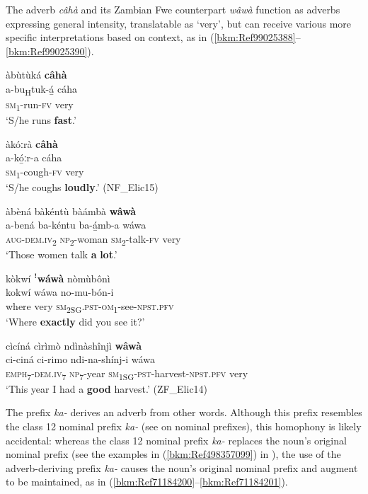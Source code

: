 The adverb \textit{câhà} and its Zambian Fwe counterpart \textit{wâwà} function as adverbs expressing general intensity, translatable as ‘very’, but can receive various more specific interpretations based on context, as in (\ref{bkm:Ref99025388}--\ref{bkm:Ref99025390}).

\ea
\label{bkm:Ref99025388}
àbùtùká \textbf{câhà}\\
\gll a-bu\textsubscript{H}tuk-á̲  cáha\\
\textsc{sm}\textsubscript{1}-run-\textsc{fv}  very\\
\glt ‘S/he runs \textbf{fast}.’
\z

\ea
\glll àkóːrà \textbf{câhà}\\
a-kó̲ːr-a    cáha\\
\textsc{sm}\textsubscript{1}-cough-\textsc{fv}  very\\
\glt ‘S/he coughs \textbf{loudly}.’ (NF\_Elic15)
\z

\ea
àbèná bàkéntù bàámbà \textbf{wâwà}\\
\gll a-bená  ba-kéntu  ba-á̲mb-a  wáwa\\
\textsc{aug}-\textsc{dem}.\textsc{iv}\textsubscript{2}  \textsc{np}\textsubscript{2}-woman  \textsc{sm}\textsubscript{2}-talk-\textsc{fv}  very\\
\glt ‘Those women talk \textbf{a} \textbf{lot}.’
\z

\ea
kòkwí  ꜝ\textbf{wáwà} nòmùbônì\\
\gll kokwí  wáwa  no-mu-bón-i\\
where  very  \textsc{sm}\textsubscript{2SG}.\textsc{pst}-\textsc{om}\textsubscript{1}-see-\textsc{npst}.\textsc{pfv}\\
\glt ‘Where \textbf{exactly} did you see it?’
\z

\ea
\label{bkm:Ref99025390}
cìcíná cìrìmò ndìnàshînjì \textbf{wâwà}\\
\gll ci-ciná    ci-rimo  ndi-na-shínj-i      wáwa\\
\textsc{emph}\textsubscript{7}-\textsc{dem}.\textsc{iv}\textsubscript{7}  \textsc{np}\textsubscript{7}-year  \textsc{sm}\textsubscript{1SG}-\textsc{pst}-harvest-\textsc{npst}.\textsc{pfv}  very\\
\glt ‘This year I had a \textbf{good} harvest.’ (ZF\_Elic14)
\z

The prefix \textit{ka-} derives an adverb from other words. Although this prefix resembles the class 12 nominal prefix \textit{ka-} (see  on nominal prefixes), this homophony is likely accidental: whereas the class 12 nominal prefix \textit{ka-} replaces the noun’s original nominal prefix (see the examples in (\ref{bkm:Ref498357099}) in ), the use of the adverb-deriving prefix \textit{ka-} causes the noun’s original nominal prefix and augment to be maintained, as in (\ref{bkm:Ref71184200}--\ref{bkm:Ref71184201}).

